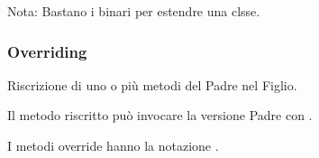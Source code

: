 Nota: Bastano i binari per estendre una clsse.

\subsubsection{Overriding}
Riscrizione di uno o più metodi del Padre nel Figlio.

Il metodo riscritto può invocare la versione Padre con .

I metodi override hanno la notazione .
